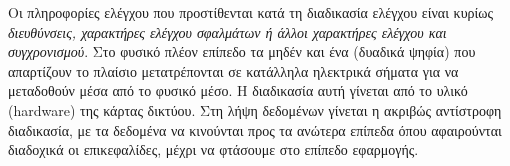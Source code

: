 Οι πληροφορίες ελέγχου που προστίθενται κατά τη διαδικασία ελέγχου είναι κυρίως \emph{διευθύνσεις, χαρακτήρες ελέγχου σφαλμάτων ή άλλοι χαρακτήρες ελέγχου και συγχρονισμού}. Στο φυσικό πλέον επίπεδο τα μηδέν και ένα (δυαδικά ψηφία) που απαρτίζουν το πλαίσιο μετατρέπονται σε κατάλληλα ηλεκτρικά σήματα για να μεταδοθούν μέσα από το φυσικό μέσο. Η διαδικασία αυτή γίνεται από το υλικό (hardware) της κάρτας δικτύου. Στη λήψη δεδομένων γίνεται η ακριβώς αντίστροφη διαδικασία, με τα δεδομένα να κινούνται προς τα ανώτερα επίπεδα όπου αφαιρούνται διαδοχικά οι επικεφαλίδες, μέχρι να φτάσουμε στο επίπεδο εφαρμογής.